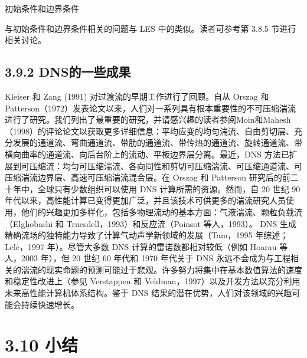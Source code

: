 \documentclass[11pt,a4paper,openany,fontset=none]{ctexbook}
\begin{document}
初始条件和边界条件

与初始条件和边界条件相关的问题与 LES 中的类似。读者可参考第 3.8.5 节进行相关讨论。

\subsection*{3.9.2 DNS的一些成果}

Kleiser 和 Zang (1991) 对过渡流的早期工作进行了回顾。自从 Orszag 和 Patterson（1972）发表论文以来，人们对一系列具有根本重要性的不可压缩湍流进行了研究。我们列出了最重要的研究，并请感兴趣的读者参阅Moin和Mahesh（1998）的评论论文以获取更多详细信息：平均应变的均匀湍流、自由剪切层、充分发展的通道流、弯曲通道流、带肋的通道流、带传热的通道流、旋转通道流、带横向曲率的通道流、向后台阶上的流动、平板边界层分离。最近，DNS 方法已扩展到可压缩流：均匀可压缩湍流、各向同性和剪切可压缩湍流、可压缩通道流、可压缩湍流边界层、高速可压缩湍流混合层。在 Orszag 和 Patterson 研究后的前二十年中，全球只有少数组织可以使用 DNS 计算所需的资源。然而，自 20 世纪 90 年代以来，高性能计算已变得更加广泛，并且该技术可供更多的湍流研究人员使用，他们的兴趣更加多样化，包括多物理流动的基本方面：气液湍流、颗粒负载流（Elghobashi 和 Truesdell，1993）和反应流（Poinsot 等人，1993）。 DNS 生成精确流场的独特能力导致了计算气动声学新领域的发展（Tam，1995 年综述；Lele，1997 年）。尽管大多数 DNS 计算的雷诺数都相对较低（例如 Hoarau 等人，2003 年），但 20 世纪 60 年代和 1970 年代关于 DNS 永远不会成为与工程相关的湍流的现实命题的预测可能过于悲观。许多努力将集中在基本数值算法的速度和稳定性改进上（参见 Verstappen 和 Veldman，1997）以及开发方法以充分利用未来高性能计算机体系结构。鉴于 DNS 结果的潜在优势，人们对该领域的兴趣可能会持续快速增长。

\section*{3.10 小结}
\end{document}
